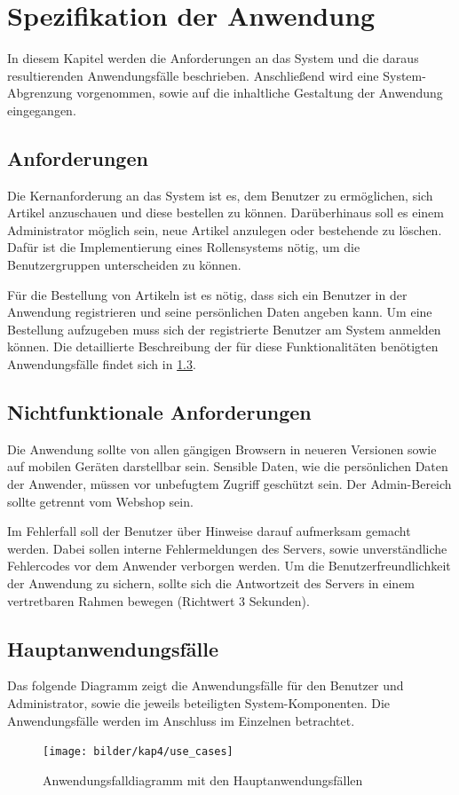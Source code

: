 \section{Spezifikation der Anwendung}\label{specification} \thispagestyle{nomarkstyle}
In diesem Kapitel werden die Anforderungen an das System und die daraus resultierenden Anwendungsfälle beschrieben.
Anschließend wird eine System-Abgrenzung vorgenommen, sowie auf die inhaltliche Gestaltung der Anwendung eingegangen.

\subsection{Anforderungen}
Die Kernanforderung an das System ist es, dem Benutzer zu ermöglichen, sich Artikel anzuschauen und diese bestellen zu können.
Darüberhinaus soll es einem Administrator möglich sein, neue Artikel anzulegen oder bestehende zu löschen.
Dafür ist die Implementierung eines Rollensystems nötig, um die Benutzergruppen unterscheiden zu können.

Für die Bestellung von Artikeln ist es nötig, dass sich ein Benutzer in der Anwendung registrieren und seine persönlichen Daten angeben kann.
Um eine Bestellung aufzugeben muss sich der registrierte Benutzer am System anmelden können.
Die detaillierte Beschreibung der für diese Funktionalitäten benötigten Anwendungsfälle findet sich in \cref{usecases}.
\subsection{Nichtfunktionale Anforderungen}
Die Anwendung sollte von allen gängigen Browsern in neueren Versionen sowie auf mobilen Geräten darstellbar sein.
Sensible Daten, wie die persönlichen Daten der Anwender, müssen vor unbefugtem Zugriff geschützt sein.
Der Admin-Bereich sollte getrennt vom Webshop sein.

Im Fehlerfall soll der Benutzer über Hinweise darauf aufmerksam gemacht werden.
Dabei sollen interne Fehlermeldungen des Servers, sowie unverständliche Fehlercodes vor dem Anwender verborgen werden.
Um die Benutzerfreundlichkeit der Anwendung zu sichern, sollte sich die Antwortzeit des Servers in einem vertretbaren Rahmen bewegen (Richtwert 3 Sekunden).
\subsection{Hauptanwendungsfälle}\label{usecases}
Das folgende Diagramm zeigt die Anwendungsfälle für den Benutzer und Administrator, sowie die jeweils beteiligten System-Komponenten.
Die Anwendungsfälle werden im Anschluss im Einzelnen betrachtet.
\begin{figure}[ht!]
	\centering
	\texttt{[image: bilder/kap4/use\_cases]}
	\caption{Anwendungsfalldiagramm mit den Hauptanwendungsfällen}
	\label{fig:usecases}
\end{figure}

